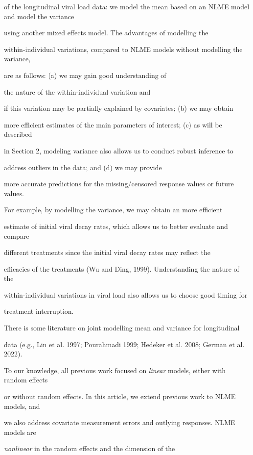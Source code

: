 \documentclass[12pt]{article}
\begin{document}
of the longitudinal viral load data: we model the mean based on an NLME model and model the variance 

using another mixed effects model. The advantages of modelling the 

within-individual variations, compared to NLME models without modelling the variance,

 are as follows: (a) we may gain good understanding of 

the nature of the within-individual variation  and 

if this variation may be partially explained by covariates; (b) we may obtain 

more efficient estimates of the main parameters of interest; (c) as will be described 

in Section 2, modeling variance also allows us to conduct robust inference to 

address outliers in the data; and (d) we may provide 

more accurate predictions for the missing/censored response values or future values. 



   For example, by modelling the variance, we may obtain an more efficient 

estimate of initial viral decay rates, which allows us to better evaluate and compare 

different treatments since the initial viral decay rates may reflect the 

efficacies of the treatments (Wu and Ding, 1999). Understanding the nature of the 

within-individual variations in viral load also allows us to choose good timing for 

treatment interruption. 



    There is some literature on joint modelling mean and variance for longitudinal 

data (e.g., Lin et al. 1997; Pourahmadi  1999; Hedeker et al. 2008; German et al. 2022). 

To our knowledge, all previous work focused on {\em linear} models, either with random effects 

or without random effects. In this article, we extend previous work to NLME models, and 

we also address covariate measurement errors and outlying responses. NLME models are 

{\em nonlinear} in the random effects and the dimension of the 
\end{document}
